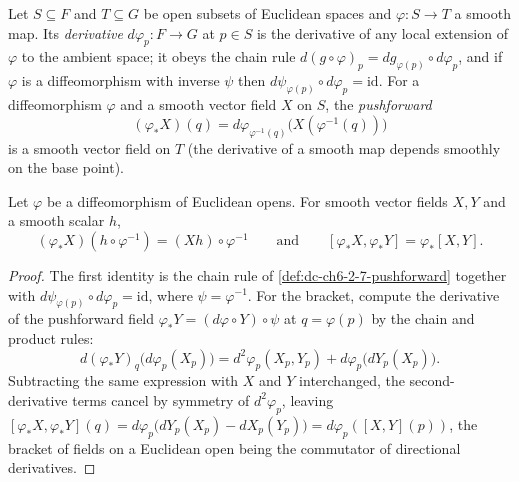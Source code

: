 \begin{definition}
  \label{def:dc-ch6-2-7-pushforward}


  Let $S\subseteq F$ and $T\subseteq G$ be open subsets of Euclidean spaces and
  $\varphi:S\to T$ a smooth map. Its \emph{derivative} $d\varphi_p:F\to G$ at
  $p\in S$ is the derivative of any local extension of $\varphi$ to the
  ambient space; it obeys the chain rule
  $d(g\circ\varphi)_p=dg_{\varphi(p)}\circ d\varphi_p$, and if $\varphi$ is a
  diffeomorphism with inverse $\psi$ then
  $d\psi_{\varphi(p)}\circ d\varphi_p=\mathrm{id}$. For a diffeomorphism
  $\varphi$ and a smooth vector field $X$ on $S$, the \emph{pushforward}
  $$
  (\varphi_*X)(q)=d\varphi_{\varphi^{-1}(q)}\bigl(X(\varphi^{-1}(q))\bigr)
  $$
  is a smooth vector field on $T$ (the derivative of a smooth map depends
  smoothly on the base point).
\end{definition}

\begin{lemma}
  \label{lem:dc-ch6-2-7-pushforward-naturality}


  Let $\varphi$ be a diffeomorphism of Euclidean opens. For smooth vector
  fields $X,Y$ and a smooth scalar $h$,
  $$
  (\varphi_*X)(h\circ\varphi^{-1})=(Xh)\circ\varphi^{-1}
  \qquad\text{and}\qquad
  [\varphi_*X,\varphi_*Y]=\varphi_*[X,Y].
  $$
\end{lemma}
\begin{proof}

  \sketch
  The first identity is the chain rule of \cref{def:dc-ch6-2-7-pushforward}
  together with $d\psi_{\varphi(p)}\circ d\varphi_p=\mathrm{id}$, where
  $\psi=\varphi^{-1}$. For the bracket, compute the derivative of the
  pushforward field $\varphi_*Y=(d\varphi\circ Y)\circ\psi$ at
  $q=\varphi(p)$ by the chain and product rules:
  $$
  d(\varphi_*Y)_q\bigl(d\varphi_p(X_p)\bigr)
    = d^2\varphi_p(X_p,Y_p)+d\varphi_p\bigl(dY_p(X_p)\bigr).
  $$
  Subtracting the same expression with $X$ and $Y$ interchanged, the
  second-derivative terms cancel by symmetry of $d^2\varphi_p$,
  leaving
  $[\varphi_*X,\varphi_*Y](q)
    =d\varphi_p\bigl(dY_p(X_p)-dX_p(Y_p)\bigr)=d\varphi_p([X,Y](p))$,
  the bracket of fields on a Euclidean open being the commutator of directional
  derivatives.
\end{proof}

